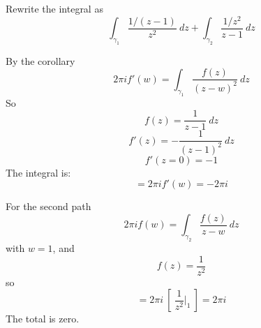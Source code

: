 \documentclass[11pt, oneside]{article}
\begin{document}
Rewrite the integral as
\[ \int_{\gamma_1} \frac{1/(z-1)}{z^2} \ dz + \int_{\gamma_2} \frac{1/z^2}{z - 1} \ dz \]

By the corollary
\[ 2 \pi i f'(w) =  \int_{\gamma_1} \frac{f(z)}{(z - w)^2} \ dz \]
So 
\[ f(z) = \frac{1}{z - 1} \ dz \]
\[ f'(z) = -\frac{1}{(z - 1)^2} \ dz \]
\[ f'(z = 0) = -1 \]
The integral is:
\[ = 2 \pi i f'(w) = -2 \pi i  \]

For the second path
\[ 2 \pi i f(w) =  \int_{\gamma_2} \frac{f(z)}{z - w} \ dz \]
with $w = 1$, and 
\[ f(z) = \frac{1}{z^2} \]
so
\[ = 2 \pi i \ [ \  \frac{1}{z^2} \bigg |_1 \ ] = 2 \pi i \]
The total is zero.
\end{document}
